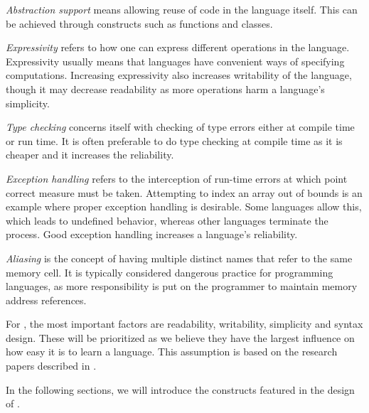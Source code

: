 \textit{Abstraction support} means allowing reuse of code in the language itself. 
This can be achieved through constructs such as functions and classes.

\textit{Expressivity} refers to how one can express different operations in the language.
Expressivity usually means that languages have convenient ways of specifying computations. 
Increasing expressivity also increases writability of the language, though it may decrease readability as more operations harm a language's simplicity.
 
\textit{Type checking} concerns itself with checking of type errors either at compile time or run time. 
It is often preferable to do type checking at compile time as it is cheaper and it increases the reliability.

\textit{Exception handling} refers to the interception of run-time errors at which point correct measure must be taken. 
Attempting to index an array out of bounds is an example where proper exception handling is desirable.
Some languages allow this, which leads to undefined behavior, whereas other languages terminate the process.
Good exception handling increases a language's reliability.

\textit{Aliasing} is the concept of having multiple distinct names that refer to the same memory cell. 
It is typically considered dangerous practice for programming languages, as more responsibility is put on the programmer to maintain memory address references.

For \dazel{}, the most important factors are readability, writability, simplicity and syntax design. 
These will be  prioritized as we believe they have the largest influence on how easy it is to learn a language.
This assumption is based on the research papers described in .

In the following sections, we will introduce the constructs featured in the design of \dazel{}.